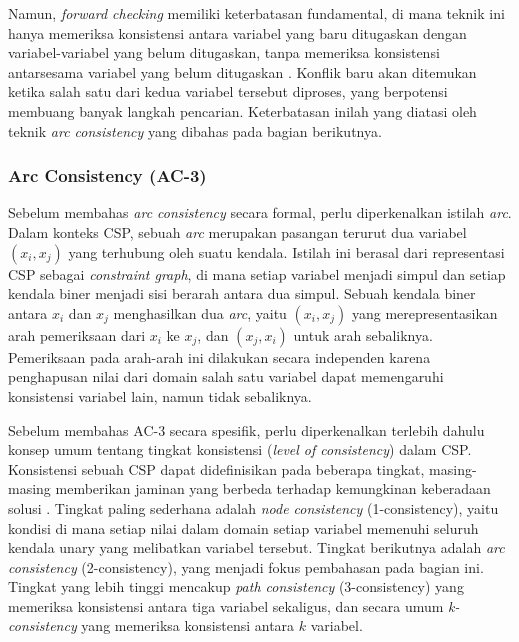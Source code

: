 Namun, \textit{forward checking} memiliki keterbatasan fundamental, di mana teknik ini hanya memeriksa konsistensi antara variabel yang baru ditugaskan dengan variabel-variabel yang belum ditugaskan, tanpa memeriksa konsistensi antarsesama variabel yang belum ditugaskan \cite{russell2020artificial}. Konflik baru akan ditemukan ketika salah satu dari kedua variabel tersebut diproses, yang berpotensi membuang banyak langkah pencarian. Keterbatasan inilah yang diatasi oleh teknik \textit{arc consistency} yang dibahas pada bagian berikutnya.

\subsubsection{Arc Consistency (AC-3)}
\label{subsubsec:ac3}
Sebelum membahas \textit{arc consistency} secara formal, perlu diperkenalkan istilah \textit{arc}. Dalam konteks CSP, sebuah \textit{arc} merupakan pasangan terurut dua variabel $(x_i, x_j)$ yang terhubung oleh suatu kendala. Istilah ini berasal dari representasi CSP sebagai \textit{constraint graph}, di mana setiap variabel menjadi simpul dan setiap kendala biner menjadi sisi berarah antara dua simpul. Sebuah kendala biner antara $x_i$ dan $x_j$ menghasilkan dua \textit{arc}, yaitu $(x_i, x_j)$ yang merepresentasikan arah pemeriksaan dari $x_i$ ke $x_j$, dan $(x_j, x_i)$ untuk arah sebaliknya. Pemeriksaan pada arah-arah ini dilakukan secara independen karena penghapusan nilai dari domain salah satu variabel dapat memengaruhi konsistensi variabel lain, namun tidak sebaliknya.

Sebelum membahas AC-3 secara spesifik, perlu diperkenalkan terlebih dahulu konsep umum tentang tingkat konsistensi (\textit{level of consistency}) dalam CSP. Konsistensi sebuah CSP dapat didefinisikan pada beberapa tingkat, masing-masing memberikan jaminan yang berbeda terhadap kemungkinan keberadaan solusi \cite{bessiere2006constraint}. Tingkat paling sederhana adalah \textit{node consistency} (1-consistency), yaitu kondisi di mana setiap nilai dalam domain setiap variabel memenuhi seluruh kendala unary yang melibatkan variabel tersebut. Tingkat berikutnya adalah \textit{arc consistency} (2-consistency), yang menjadi fokus pembahasan pada bagian ini. Tingkat yang lebih tinggi mencakup \textit{path consistency} (3-consistency) yang memeriksa konsistensi antara tiga variabel sekaligus, dan secara umum \textit{k-consistency} yang memeriksa konsistensi antara $k$ variabel.

